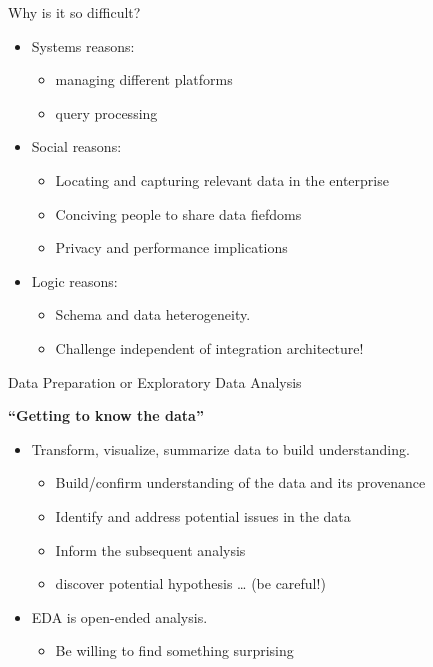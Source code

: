 \documentclass[aspectratio=169]{../latex_main/tntbeamer}  %
\begin{document}
\begin{frame}[c]{Why is it so difficult?}
    \begin{itemize}
        \item Systems reasons: 
        \begin{itemize}
            \item managing different platforms
            \item query processing
        \end{itemize}
        \item Social reasons:
        \begin{itemize}
            \item Locating and capturing relevant data in the enterprise
            \item Conciving people to share data fiefdoms
            \item Privacy and performance implications
        \end{itemize}
        \item Logic reasons: 
        \begin{itemize}
            \item Schema and data heterogeneity.
            \item Challenge independent of integration architecture!
        \end{itemize}
    \end{itemize}
\end{frame}

\begin{frame}[c]{Data Preparation or Exploratory Data Analysis}

\textbf{``Getting to know the data''}

    \begin{itemize}
        \item Transform, visualize, summarize data to build understanding.
        \begin{itemize}
            \item Build/confirm understanding of the data and its provenance
            \item Identify and address potential issues in the data
            \item Inform the subsequent analysis 
            \item discover potential hypothesis … (be careful!)
        \end{itemize}
        \item EDA is open-ended analysis.
        \begin{itemize}
            \item Be willing to find something surprising
        \end{itemize}
    \end{itemize}
\end{frame}
\end{document}
